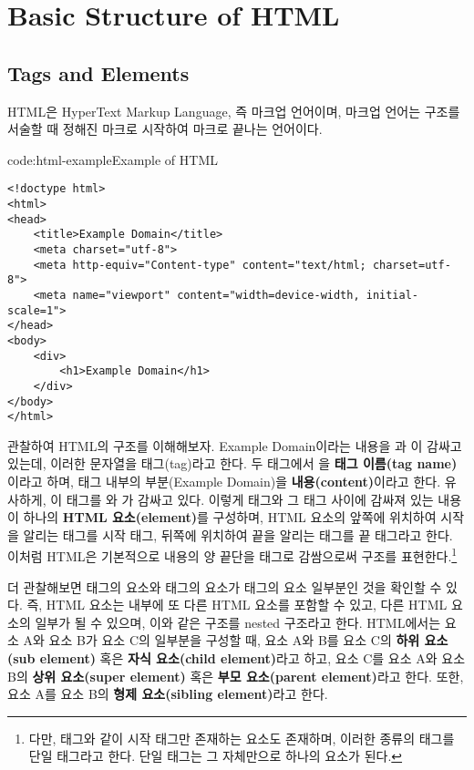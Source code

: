 \section{Basic Structure of HTML} \label{sect:basic-structure-of-html}

\subsection*{Tags and Elements}
HTML은 HyperText Markup Language, 즉 마크업 언어이며, 마크업 언어는 구조를 서술할 때 정해진 마크로 시작하여 마크로 끝나는 언어이다.

\begin{codeenv}{code:html-example}{Example of HTML}\begin{verbatim}
<!doctype html>
<html>
<head>
    <title>Example Domain</title>
    <meta charset="utf-8">
    <meta http-equiv="Content-type" content="text/html; charset=utf-8">
    <meta name="viewport" content="width=device-width, initial-scale=1">
</head>
<body>
    <div>
        <h1>Example Domain</h1>
    </div>
</body>
</html>
\end{verbatim}
\end{codeenv}

\을 관찰하여 HTML의 구조를 이해해보자. Example Domain이라는 내용을 과 이 감싸고 있는데, 이러한 문자열을 태그(tag)라고 한다. 두 태그에서 을 \textbf{태그 이름(tag name)}이라고 하며, 태그 내부의 부분(Example Domain)을 \textbf{내용(content)}이라고 한다. 유사하게, 이  태그를 와 가 감싸고 있다. 이렇게 태그와 그 태그 사이에 감싸져 있는 내용이 하나의 \textbf{HTML 요소(element)}를 구성하며, HTML 요소의 앞쪽에 위치하여 시작을 알리는 태그를 시작 태그, 뒤쪽에 위치하여 끝을 알리는 태그를 끝 태그라고 한다. 이처럼 HTML은 기본적으로 내용의 양 끝단을 태그로 감쌈으로써 구조를 표현한다.\footnote{다만,  태그와 같이 시작 태그만 존재하는 요소도 존재하며, 이러한 종류의 태그를 단일 태그라고 한다. 단일 태그는 그 자체만으로 하나의 요소가 된다.}

\을 더 관찰해보면  태그의 요소와  태그의 요소가  태그의 요소 일부분인 것을 확인할 수 있다. 즉, HTML 요소는 내부에 또 다른 HTML 요소를 포함할 수 있고, 다른 HTML 요소의 일부가 될 수 있으며, 이와 같은 구조를 nested 구조라고 한다. HTML에서는 요소 A와 요소 B가 요소 C의 일부분을 구성할 때, 요소 A와 B를 요소 C의 \textbf{하위 요소(sub element)} 혹은 \textbf{자식 요소(child element)}라고 하고, 요소 C를 요소 A와 요소 B의 \textbf{상위 요소(super element)} 혹은 \textbf{부모 요소(parent element)}라고 한다. 또한, 요소 A를 요소 B의 \textbf{형제 요소(sibling element)}라고 한다.

